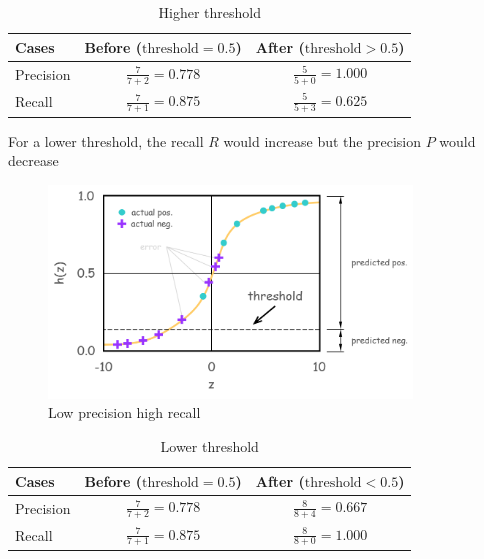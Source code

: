 \begin{itemize}
    \begin{table}[H]
        \renewcommand\arraystretch{1.5}
        \caption{Higher threshold}
        \centering
        \begin{tabular}{lcc}
            \hline %
            Cases      & Before ($\text{threshold} = 0.5$)     & After ($\text{threshold} > 0.5$)    \\ 
            \hline %
            Precision  & $\frac{7}{7+2} = 0.778$               & $\frac{5}{5+0} = 1.000$             \\ 
            Recall     & $\frac{7}{7+1} = 0.875$               & $\frac{5}{5+3} = 0.625$             \\
            \hline %
        \end{tabular}
    \end{table}  
    
    For a lower threshold, the recall $R$ would increase but the precision $P$ would decrease
    \begin{figure}[H]
        \centering
        \includegraphics[width=3.8in]{./images/error_lowPrecisionHighRecall.png}
        \caption{Low precision high recall}
    \end{figure}
    
    \begin{table}[H]
        \renewcommand\arraystretch{1.5}
        \caption{Lower threshold}
        \centering
        \begin{tabular}{lcc}
            \hline %
            Cases      & Before ($\text{threshold} = 0.5$)     & After ($\text{threshold} < 0.5$)    \\ 
            \hline %
            Precision  & $\frac{7}{7+2} = 0.778$               & $\frac{8}{8+4} = 0.667$             \\ 
            Recall     & $\frac{7}{7+1} = 0.875$               & $\frac{8}{8+0} = 1.000$             \\
            \hline %
        \end{tabular}
    \end{table}  
    

\end{itemize}
